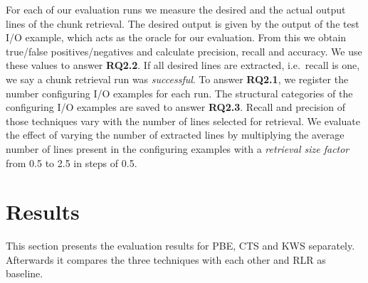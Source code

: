 \documentclass[\myrootdir/main.tex]{subfiles}
\begin{document}
For each of our evaluation runs we measure the desired and the actual output lines of the chunk retrieval.
The desired output is given by the output of the test I/O example, which acts as the oracle for our evaluation.
From this we obtain true/false positives/negatives and calculate precision, recall and accuracy.
We use these values to answer \textbf{RQ2.2}.
If all desired lines are extracted, i.e.\ recall is one, we say a chunk retrieval run was \emph{successful}.
To answer \textbf{RQ2.1}, we register the number configuring I/O examples for each run.
The structural categories of the configuring I/O examples are saved to answer \textbf{RQ2.3}.
Recall and precision of those techniques vary with the number of lines selected for retrieval.
We evaluate the effect of varying the number of extracted lines by multiplying the average number of lines present in the configuring examples with a \emph{retrieval size factor} from 0.5 to 2.5 in steps of 0.5.


\section{Results}
This section presents the evaluation results for PBE, CTS and KWS separately.
Afterwards it compares the three techniques with each other and RLR as baseline.


\end{document}
